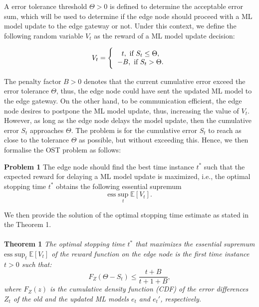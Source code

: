 \documentclass{mpaper}
\begin{document}
A error tolerance threshold $\Theta > 0$ is defined to determine the acceptable error sum, which will be used to determine if the 
edge node should proceed with a ML model update to the edge gateway or not. Under this context, we define the following random variable $V_{t}$ as the reward of a ML model update decision:

\begin{equation}\label{reward}
    V_t = \Bigg\{ \begin{tabular}{c}
                  $t,\ \text{if}\ S_t \leq \Theta$, \\
                  $-B,\ \text{if}\ S_t > \Theta.$
                  \end{tabular}
\end{equation}

The penalty factor $B> 0$ denotes that the current cumulative error exceed the error tolerance $\Theta$, thus, the edge node could have sent the updated ML model to the edge gateway. On the other hand, to be communication efficient, the edge node desires to postpone the ML model update, thus, increasing the value of $V_{t}$. However, as long as the edge node delays the model update, then the cumulative error $S_{t}$ approaches $\Theta$. The problem is for the cumulative error $S_{t}$ to reach as close to the tolerance $\Theta$ as possible, but without exceeding this. Hence, we then formalise the OST problem as follows:

\textbf{Problem 1} The edge node should find the best time instance $t^{*}$ such that the expected reward for delaying a ML model update is maximized, i.e., the optimal stopping time $t^{*}$ obtains the following essential supremum
\[
\mbox{ess} \sup_{t} \mathbb{E}[V_{t}].
\]

We then provide the solution of the optimal stopping time estimate as stated in the Theorem 1.
\\
\\
\textbf{Theorem 1}\textit{
The optimal stopping time $t^{*}$ that maximizes the essential supremum $\mbox{ess} \sup_{t} \mathbb{E}[V_{t}]$ of the reward function on the edge node is the first time instance $t>0$ such that:
\[
F_{Z}(\Theta - S_{t}) \leq \frac{t+B}{t+1+B},
\]
where $F_{Z}(z)$ is the cumulative density function (CDF) of the error differences $Z_{t}$ of the old and the updated ML models $e_{t}$ and $e_{t}'$, respectively.}  
\\

\end{document}
